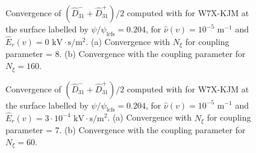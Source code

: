 \begin{figure}[t]
	\centering	
	\begin{subfigure}[t]{0.32\textwidth}
		
		\caption{}
		\label{subfig:DKES_D31_convergence_Legendre_W7X_KJM_0204_Erho_0_Detail}
	\end{subfigure}
	\begin{subfigure}[t]{0.32\textwidth}
		\caption{}
		\label{subfig:DKES_D31_convergence_Coupling_parameter_W7X_KJM_0204_Erho_0}
	\end{subfigure}
	
	
	\caption{Convergence of $(\widehat{D}_{31}^- + \widehat{D}_{31}^+) /2$ computed with {\DKES} for W7X-KJM at the surface labelled by $\psi/\psi_{\text{lcfs}}=0.204$, for $\hat{\nu}(v)=10^{-5}$ $\text{m}^{-1}$ and $\hat{E}_r(v)=0$ $\text{kV}\cdot\text{s}/\text{m}^2$. (a) Convergence with $N_\xi$ for coupling parameter = 8. (b) Convergence with the coupling parameter for $N_\xi=160 $.}
	\label{fig:DKES_Convergence_W7X_KJM_Er_0}
\end{figure}



\begin{figure}[t]
	\centering
	\begin{subfigure}[t]{0.32\textwidth}
		
		\caption{}
		\label{subfig:DKES_D31_convergence_Legendre_W7X_KJM_0204_Erho_3e-4_Detail}
	\end{subfigure}
	\begin{subfigure}[t]{0.32\textwidth}
		\caption{}
		\label{subfig:DKES_D31_convergence_Coupling_parameter_W7X_KJM_0204_Erho_3e-4}
	\end{subfigure}
	
	\caption{Convergence of $(\widehat{D}_{31}^- + \widehat{D}_{31}^+) /2$ computed with {\DKES} for W7X-KJM at the surface labelled by $\psi/\psi_{\text{lcfs}}=0.204$, for $\hat{\nu}(v)=10^{-5}$ $\text{m}^{-1}$ and $\hat{E}_r(v)=3\cdot 10^{-4}$ $\text{kV}\cdot\text{s}/\text{m}^2$. (a) Convergence with $N_\xi$ for coupling parameter = 7. (b) Convergence with the coupling parameter for $N_\xi= 60$.}
	\label{fig:DKES_Convergence_W7X_KJM_Er_3e-4}
\end{figure}



